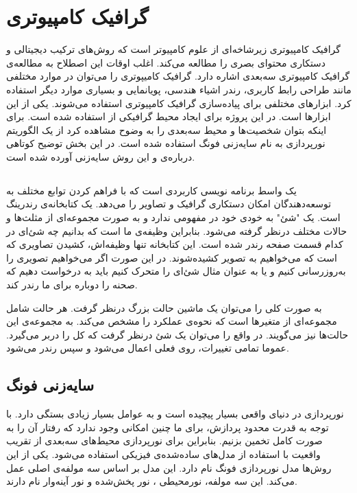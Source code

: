 \section{گرافیک کامپیوتری}

گرافیک کامپیوتری زیرشاخه‌ای از علوم کامپیوتر است که روش‌های 
ترکیب دیجیتالی و دستکاری محتوای بصری 
را مطالعه می‌کند.
اغلب اوقات این اصطلاح به مطالعه‌ی گرافیک 
کامپیوتری سه‌بعدی اشاره دارد.
\cite{ComputerGraphicsWikipedia}
گرافیک کامیپوتری را می‌توان در 
موارد مختلفی مانند طراحی رابط کاربری،
رندر اشیاء هندسی، پویانمایی و بسیاری 
موارد دیگر استفاده کرد.
ابزارهای مختلفی برای پیاده‌سازی گرافیک کامپیوتری استفاده می‌شوند.
یکی از این ابزار‌ها 
است.
در این پروژه برای ایجاد محیط گرافیکی از 
استفاده شده است.
برای اینکه بتوان شخصیت‌ها و محیط سه‌بعدی را به وضوح مشاهده کرد از یک الگوریتم نورپردازی به نام 
سایه‌زنی فونگ استفاده شده است.
در این بخش توضیح کوتاهی دربا‌ره‌ی
 و
این روش سایه‌زنی آورده شده است.

\subsection {
    }

یک واسط برنامه نویسی کاربردی  
است که با فراهم کردن توابع مختلف به توسعه‌دهندگان امکان دستکاری گرافیک و تصاویر را می‌دهد.
یک کتابخانه‌ی رندرینگ است.
یک "شئ" به خودی خود در
مفهومی ندارد
و به صورت مجموعه‌ای از مثلث‌ها و حالات مختلف درنظر گرفته می‌شود. بنابراین  
وظیفه‌ی ما است که بدانیم چه شئ‌ای در کدام قسمت صفحه رندر شده است. این کتابخانه تنها وظیفه‌اش، کشیدن تصاویری که است که می‌خواهیم به تصویر کشیده‌شوند.
در این صورت اگر می‌خواهیم تصویری را به‌روزرسانی کنیم و یا به عنوان مثال شئ‌ای را متحرک کنیم باید به 
درخواست دهیم که صحنه را دوباره‌ برای ما رندر کند.
\cite{KhronosUsingOpenGL}

به صورت کلی 
را می‌توان یک ماشین حالت بزرگ درنظر گرفت. هر حالت شامل مجموعه‌ای از متغیر‌ها است که نحوه‌ی عملکرد
را مشخص می‌کند. 
به مجموعه‌ی این حالت‌ها 
نیز می‌گویند. 
در واقع  
را می‌توان یک شئ درنظر گرفت که کل
را دربر می‌گیرد. عموما تمامی تغییرات، روی 
فعلی اعمال می‌شود و سپس رندر می‌شود.
\cite{KhronosUsingOpenGL} \cite{LearnOpenGL_GettingStarted}


\subsection{سایه‌زنی فونگ}
\label{PhongShading}
نورپردازی در دنیای واقعی بسیار پیچیده است و
به عوامل بسیار زیادی بستگی دارد. با توجه به 
قدرت محدود پردازش، برای ما چنین امکانی وجود ندارد که رفتار آن را 
به صورت کامل تخمین بزنیم.
بنابراین برای نورپردازی محیط‌های سه‌بعدی از تقریب‌ واقعیت 
با استفاده از مدل‌های ساده‌شده‌ی فیزیکی استفاده می‌شود.
یکی از این روش‌ها مدل نورپردازی فونگ نام دارد.
این مدل بر اساس سه مولفه‌ی اصلی عمل می‌کند.
این سه ‌مولفه، نورمحیطی
، نور پخش‌شده
و نور آینه‌وار
نام دارند.
\cite{LearnOpenGLPhongShading}
